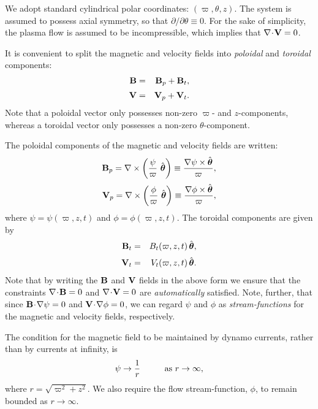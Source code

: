We adopt standard cylindrical polar coordinates: $(\varpi,\theta,z)$. The
system is assumed to possess axial symmetry, so that $\partial/\partial\theta
\equiv 0$. For the sake of simplicity, the plasma flow is assumed to be 
incompressible, which implies that $\nabla\!\cdot\!{\bf V}=0$. 

It is convenient to split the magnetic and velocity fields into {\em poloidal}
and {\em toroidal} components:
\begin{eqnarray}
{\bf B} &=& {\bf B}_p + {\bf B}_t,\\[0.5ex]
{\bf V} &=& {\bf V}_p + {\bf V}_t.
\end{eqnarray}
Note that a poloidal vector only possesses non-zero $\varpi$- and $z$-components,
whereas a toroidal vector only possesses a non-zero $\theta$-component.


The poloidal components of the magnetic and velocity fields are
written:
\begin{eqnarray}
{\bf B}_p = \nabla\times\left(\frac{\psi}{\varpi}\,\,\hat{\mbox{\boldmath$\theta$}}\right)
\equiv \frac{\nabla\psi\times\hat{\mbox{\boldmath$\theta$}}}{\varpi},\\[0.5ex]
{\bf V}_p = \nabla\times\left(\frac{\phi}{\varpi}\,\,\hat{\mbox{\boldmath$\theta$}}\right)
\equiv \frac{\nabla\phi\times\hat{\mbox{\boldmath$\theta$}}}{\varpi},
\end{eqnarray}
where $\psi=\psi(\varpi,z,t)$ and $\phi=\phi(\varpi,z,t)$. The
toroidal components are given by
\begin{eqnarray}
{\bf B}_t &=& B_t(\varpi,z,t)\,\hat{\mbox{\boldmath$\theta$}},\\[0.5ex]
{\bf V}_t &=& V_t(\varpi,z,t)\,\hat{\mbox{\boldmath$\theta$}}.
\end{eqnarray}
Note that by writing the ${\bf B}$ and ${\bf V}$ fields in the above form
we ensure that the constraints $\nabla\!\cdot\!{\bf B} =0$ and
$\nabla\!\cdot\!{\bf V} =0$ are {\em automatically} satisfied. Note, further,
that since ${\bf B}\!\cdot\!\nabla\psi=0$ and ${\bf V}\!\cdot\!\nabla\phi=0$,
we can regard $\psi$ and $\phi$ as {\em stream-functions} for the magnetic and
velocity fields, respectively.

The condition for the magnetic field to be maintained by dynamo currents,
rather than by currents at infinity, is
\begin{equation}\label{e5.97}
\psi\rightarrow \frac{1}{r}\mbox{\hspace{1cm}as $r\rightarrow\infty$},
\end{equation}
where $r=\sqrt{\varpi^2+z^2}$. We also require  the flow stream-function,
$\phi$, to remain bounded as $r\rightarrow\infty$.


